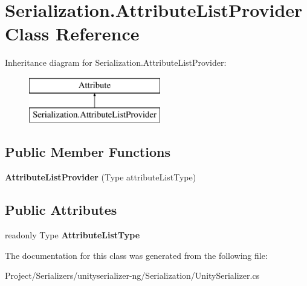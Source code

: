 \hypertarget{class_serialization_1_1_attribute_list_provider}{}\section{Serialization.\+Attribute\+List\+Provider Class Reference}
\label{class_serialization_1_1_attribute_list_provider}
Inheritance diagram for Serialization.\+Attribute\+List\+Provider\+:\begin{figure}[H]
\begin{center}
\leavevmode
\includegraphics[height=2.000000cm]{class_serialization_1_1_attribute_list_provider}
\end{center}
\end{figure}
\subsection*{Public Member Functions}
\begin{DoxyCompactItemize}
\item 
\mbox{\label{class_serialization_1_1_attribute_list_provider_a71707014902de0a17f325e2efe18df12}} 
{\bfseries Attribute\+List\+Provider} (Type attribute\+List\+Type)
\end{DoxyCompactItemize}
\subsection*{Public Attributes}
\begin{DoxyCompactItemize}
\item 
\mbox{\label{class_serialization_1_1_attribute_list_provider_a785b33c0a2e74addd6d14310fbfb5286}} 
readonly Type {\bfseries Attribute\+List\+Type}
\end{DoxyCompactItemize}


The documentation for this class was generated from the following file\+:\begin{DoxyCompactItemize}
\item 
Project/\+Serializers/unityserializer-\/ng/\+Serialization/Unity\+Serializer.\+cs\end{DoxyCompactItemize}
